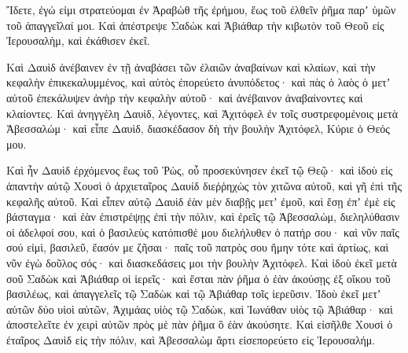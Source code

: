 {Ἴδετε, ἐγώ εἰμι στρατεύομαι ἐν Ἀραβὼθ τῆς ἐρήμου, ἕως τοῦ ἐλθεῖν ῥῆμα παρʼ ὑμῶν τοῦ ἀπαγγεῖλαί μοι.
Καὶ ἀπέστρεψε Σαδὼκ καὶ Ἀβιάθαρ τὴν κιβωτὸν τοῦ Θεοῦ εἰς Ἰερουσαλὴμ, καὶ ἐκάθισεν ἐκεῖ.
\par }{\PP {}Καὶ Δαυὶδ ἀνέβαινεν ἐν τῇ ἀναβάσει τῶν ἐλαιῶν ἀναβαίνων καὶ κλαίων, καὶ τὴν κεφαλὴν ἐπικεκαλυμμένος, καὶ αὐτὸς ἐπορεύετο ἀνυπόδετος· καὶ πὰς ὁ λαὸς ὁ μετʼ αὐτοῦ ἐπεκάλυψεν ἀνὴρ τὴν κεφαλὴν αὐτοῦ· καὶ ἀνέβαινον ἀναβαίνοντες καὶ κλαίοντες.
Καὶ ἀνηγγέλη Δαυὶδ, λέγοντες, καὶ Ἀχιτόφελ ἐν τοῖς συστρεφομένοις μετὰ Ἀβεσσαλώμ· καὶ εἶπε Δαυὶδ, διασκέδασον δὴ τὴν βουλὴν Ἀχιτόφελ, Κύριε ὁ Θεός μου.
\par }{\PP {}Καὶ ἦν Δαυὶδ ἐρχόμενος ἕως τοῦ Ῥὼς, οὗ προσεκύνησεν ἐκεῖ τῷ Θεῷ· καὶ ἰδοὺ εἰς ἀπαντὴν αὐτῷ Χουσὶ ὁ ἀρχιεταῖρος Δαυίδ διεῤῥηχὼς τὸν χιτῶνα αὐτοῦ, καὶ γῆ ἐπὶ τῆς κεφαλῆς αὐτοῦ.
Καὶ εἶπεν αὐτῷ Δαυὶδ ἐὰν μὲν διαβῇς μετʼ ἐμοῦ, καὶ ἔσῃ ἐπʼ ἐμὲ εἰς βάσταγμα·
καὶ ἐὰν ἐπιστρέψῃς ἐπὶ τὴν πόλιν, καὶ ἐρεῖς τῷ Ἀβεσσαλὼμ, διεληλύθασιν οἱ ἀδελφοί σου, καὶ ὁ βασιλεὺς κατόπισθέ μου διελήλυθεν ὁ πατήρ σου· καὶ νῦν παῖς σού εἰμὶ, βασιλεῦ, ἔασόν με ζῆσαι· παῖς τοῦ πατρὸς σου ἤμην τότε καὶ ἀρτίως, καὶ νῦν ἐγὼ δοῦλος σός· καὶ διασκεδάσεις μοι τὴν βουλὴν Ἀχιτόφελ.
Καὶ ἰδοὺ ἐκεῖ μετὰ σοῦ Σαδὼκ καὶ Ἀβιάθαρ οἱ ἱερεῖς· καὶ ἔσται πὰν ῥῆμα ὁ ἐὰν ἀκούσῃς ἐξ οἴκου τοῦ βασιλέως, καὶ ἀπαγγελεῖς τῷ Σαδὼκ καὶ τῷ Ἀβιάθαρ τοῖς ἱερεῦσιν.
Ἰδοὺ ἐκεῖ μετʼ αὐτῶν δύο υἱοὶ αὐτῶν, Ἀχιμάας υἱὸς τῷ Σαδὼκ, καὶ Ἰωνάθαν υἱὸς τῷ Ἀβιάθαρ· καὶ ἀποστελεῖτε ἐν χειρὶ αὐτῶν πρὸς μὲ πὰν ῥῆμα ὃ ἐὰν ἀκούσητε.
Καὶ εἰσῆλθε Χουσὶ ὁ ἐταῖρος Δαυὶδ εἰς τὴν πόλιν, καὶ Ἀβεσσαλὼμ ἄρτι εἰσεπορεύετο εἰς Ἰερουσαλήμ.

}
